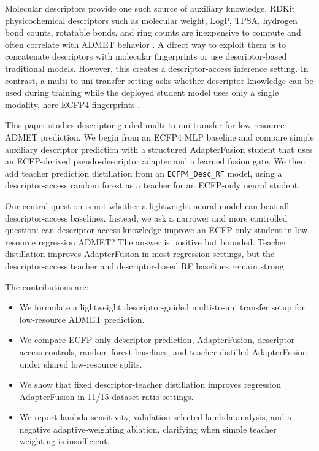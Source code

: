 \documentclass[
]{article}
\providecommand{\tightlist}{%
  \setlength{\itemsep}{0pt}\setlength{\parskip}{0pt}}
\begin{document}
Molecular descriptors provide one such source of auxiliary knowledge.
RDKit physicochemical descriptors such as molecular weight, LogP, TPSA,
hydrogen bond counts, rotatable bonds, and ring counts are inexpensive
to compute and often correlate with ADMET behavior \citep{RDKit2026}. A
direct way to exploit them is to concatenate descriptors with molecular
fingerprints or use descriptor-based traditional models. However, this
creates a descriptor-access inference setting. In contrast, a
multi-to-uni transfer setting asks whether descriptor knowledge can be
used during training while the deployed student model uses only a single
modality, here ECFP4 fingerprints \citep{Rogers2010}.

This paper studies descriptor-guided multi-to-uni transfer for
low-resource ADMET prediction. We begin from an ECFP4 MLP baseline and
compare simple auxiliary descriptor prediction with a structured
AdapterFusion student that uses an ECFP-derived pseudo-descriptor
adapter and a learned fusion gate. We then add teacher prediction
distillation from an \texttt{ECFP4\_Desc\_RF} model, using a
descriptor-access random forest as a teacher for an ECFP-only neural
student.

Our central question is not whether a lightweight neural model can beat
all descriptor-access baselines. Instead, we ask a narrower and more
controlled question: can descriptor-access knowledge improve an
ECFP-only student in low-resource regression ADMET? The answer is
positive but bounded. Teacher distillation improves AdapterFusion in
most regression settings, but the descriptor-access teacher and
descriptor-based RF baselines remain strong.

The contributions are:

\begin{itemize}
\tightlist
\item
  We formulate a lightweight descriptor-guided multi-to-uni transfer
  setup for low-resource ADMET prediction.
\item
  We compare ECFP-only descriptor prediction, AdapterFusion,
  descriptor-access controls, random forest baselines, and
  teacher-distilled AdapterFusion under shared low-resource splits.
\item
  We show that fixed descriptor-teacher distillation improves regression
  AdapterFusion in 11/15 dataset-ratio settings.
\item
  We report lambda sensitivity, validation-selected lambda analysis, and
  a negative adaptive-weighting ablation, clarifying when simple teacher
  weighting is insufficient.
\end{itemize}
\end{document}
